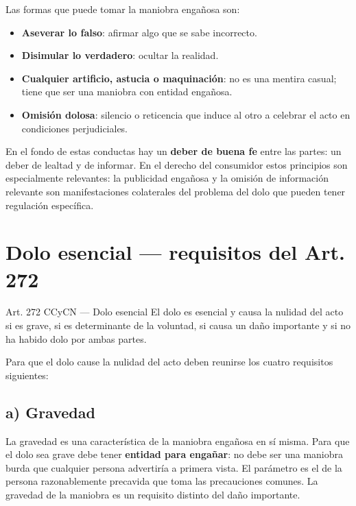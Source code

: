 \documentclass[12pt,oneside]{book}
\begin{document}
Las formas que puede tomar la maniobra engañosa son:
\begin{itemize}
    \item \textbf{Aseverar lo falso}: afirmar algo que se sabe incorrecto.
    \item \textbf{Disimular lo verdadero}: ocultar la realidad.
    \item \textbf{Cualquier artificio, astucia o maquinación}: no es una mentira casual; tiene que ser una maniobra con entidad engañosa.
    \item \textbf{Omisión dolosa}: silencio o reticencia que induce al otro a celebrar el acto en condiciones perjudiciales.
\end{itemize}

\begin{note}
En el fondo de estas conductas hay un \textbf{deber de buena fe} entre las partes: un deber de lealtad y de informar. En el derecho del consumidor estos principios son especialmente relevantes: la publicidad engañosa y la omisión de información relevante son manifestaciones colaterales del problema del dolo que pueden tener regulación específica.
\end{note}

\section{Dolo esencial --- requisitos del Art. 272}

\begin{articulo}{Art. 272 CCyCN --- Dolo esencial}
El dolo es esencial y causa la nulidad del acto si es grave, si es determinante de la voluntad, si causa un daño importante y si no ha habido dolo por ambas partes.
\end{articulo}

Para que el dolo cause la nulidad del acto deben reunirse los cuatro requisitos siguientes:

\subsection*{a) Gravedad}

La gravedad es una característica de la maniobra engañosa en sí misma. Para que el dolo sea grave debe tener \textbf{entidad para engañar}: no debe ser una maniobra burda que cualquier persona advertiría a primera vista. El parámetro es el de la persona razonablemente precavida que toma las precauciones comunes. La gravedad de la maniobra es un requisito distinto del daño importante.
\end{document}
